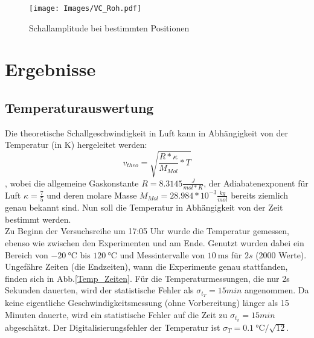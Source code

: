 \documentclass[]{article}
\begin{document}
	\begin{figure}
	\begin{center}
		\texttt{[image: Images/VC\_Roh.pdf]}
		\caption{Schallamplitude bei bestimmten Positionen}
		\label{Vc_Roh}
	\end{center}
	\end{figure}
	

	\section{Ergebnisse}
	\subsection{Temperaturauswertung}
	Die theoretische Schallgeschwindigkeit in Luft kann in Abhängigkeit von der Temperatur (in K) hergeleitet werden:
	\begin{equation}
	v_{theo}=\sqrt{\frac{R*\kappa}{M_{Mol}}*T}
	\label{v(T)}
	\end{equation}
	, wobei die allgemeine Gaskonstante $R=8.3145 \frac{J}{mol*K}$, der Adiabatenexponent für Luft $\kappa=\frac{7}{5}$ und deren molare Masse $M_{Mol}=28.984*10^{-3} \frac{kg}{mol}$ bereits ziemlich genau bekannt sind.
	Nun soll die Temperatur in Abhängigkeit von der Zeit bestimmt werden.\\
	Zu Beginn der Versuchsreihe um 17:05 Uhr wurde die Temperatur gemessen, ebenso wie zwischen den Experimenten und am Ende. Genutzt wurden dabei ein Bereich von $\SI{-20}{\celsius}$ bis $\SI{120}{\celsius}$ und Messintervalle von $\SI{10}{\milli\second}$ für $2s$ (2000 Werte).
	Ungefähre Zeiten (die Endzeiten), wann die Experimente genau stattfanden, finden sich in Abb.\ref{Temp_Zeiten}. Für die Temperaturmessungen, die nur 2s Sekunden dauerten, wird der statistische Fehler als $\sigma_{t_T}=15min$ angenommen. Da keine eigentliche Geschwindigkeitsmessung (ohne Vorbereitung) länger als 15 Minuten dauerte, wird ein statistische Fehler auf die Zeit zu $\sigma_{t_v}=15min$ abgeschätzt. Der Digitalisierungsfehler der Temperatur ist $\sigma_T=\SI{0.1}{\celsius}/\sqrt{12}$.\\
	
\end{document}
